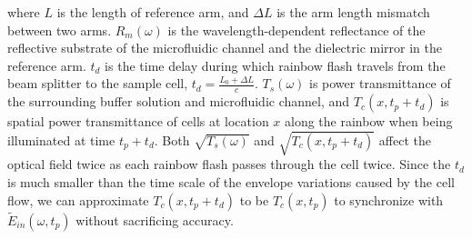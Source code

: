\documentclass[aps,pra,reprint,longbibliography,superscriptaddress]{revtex4-1}
\begin{document}
where $L$ is the length of reference arm, and $\Delta L$ is the arm length mismatch between two arms. $R_m(\omega)$ is the wavelength-dependent reflectance of the reflective substrate of the microfluidic channel and the dielectric mirror in the reference arm. $t_d$ is the time delay during which rainbow flash travels from the beam splitter to the sample cell, $t_d = \frac{L_0 + \Delta L}{c}$. $T_s(\omega)$ is power transmittance of the surrounding buffer solution and microfluidic channel, and $T_c(x,t_p + t_d)$ is spatial power transmittance of cells at location $x$ along the rainbow when being illuminated at time $t_p + t_d$. Both $\sqrt{T_s(\omega)}$ and $\sqrt{T_c(x,t_p + t_d)}$ affect the optical field twice as each rainbow flash passes through the cell twice. Since the $t_d$ is much smaller than the time scale of the envelope variations caused by the cell flow, we can approximate $T_c(x,t_p + t_d)$ to be $T_c(x,t_p)$ to synchronize with $\tilde{E}_{in}(\omega, t_p)$ without sacrificing accuracy.
\end{document}
